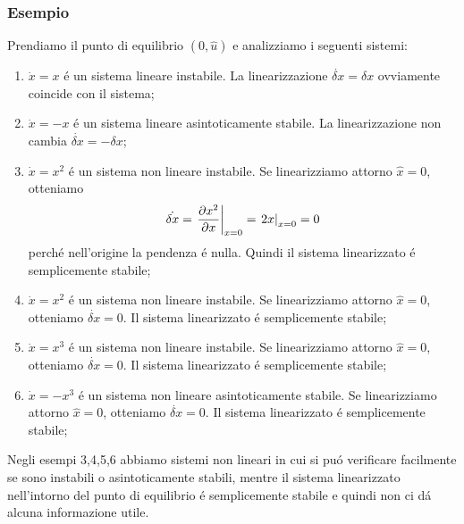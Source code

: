 \documentclass[../main.tex]{subfiles}
\begin{document}
	\subsubsection*{Esempio}
		Prendiamo il punto di equilibrio $ (0, \hat u) $ e analizziamo i seguenti sistemi:
		\begin{enumerate}
			\item
				$ \dot x = x $ \'e un sistema lineare instabile. La linearizzazione $ \dot{\delta x} = \delta x $ ovviamente coincide con il sistema;
			\item
				$ \dot x = -x $ \'e un sistema lineare asintoticamente stabile. La linearizzazione non cambia $ \dot{\delta x} = -\delta x $;
			\item
				$ \dot x = x^2 $ \'e un sistema non lineare instabile. Se linearizziamo attorno $ \hat x = 0 $, otteniamo
				\[ \dot{\delta x} = \left. \frac{\partial x^2}{\partial x} \right|_{x=0} = \left. 2x \right|_{x=0} = 0 \]
				perch\'e nell'origine la pendenza \'e nulla. Quindi il sistema linearizzato \'e semplicemente stabile;
			\item
				$ \dot x = x^2 $ \'e un sistema non lineare instabile. Se linearizziamo attorno $ \hat x = 0 $, otteniamo $ \dot{\delta x} = 0 $. Il sistema linearizzato \'e semplicemente stabile;
			\item
				$ \dot x = x^3 $ \'e un sistema non lineare instabile. Se linearizziamo attorno $ \hat x = 0 $, otteniamo $ \dot{\delta x} = 0 $. Il sistema linearizzato \'e semplicemente stabile;
			\item
				$ \dot x = -x^3 $ \'e un sistema non lineare asintoticamente stabile. Se linearizziamo attorno $ \hat x = 0 $, otteniamo $ \dot{\delta x} = 0 $. Il sistema linearizzato \'e semplicemente stabile;
		\end{enumerate}
		Negli esempi 3,4,5,6 abbiamo sistemi non lineari in cui si pu\'o verificare facilmente se sono instabili o asintoticamente stabili, mentre il sistema linearizzato nell'intorno del punto di equilibrio \'e semplicemente stabile e quindi non ci d\'a alcuna informazione utile.
\end{document}
